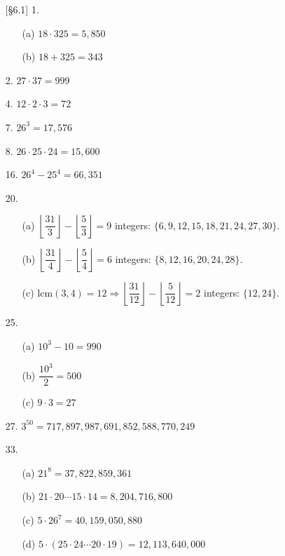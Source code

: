 \documentclass{article}
\begin{document}
\begin{enumerate}
    \item[{[\S 6.1]} 1.]
        \begin{itemize}
            \item[(a)] $18 \cdot 325 = 5,850$
            \item[(b)] $18 + 325 = 343$
        \end{itemize}
    \item[2.] $27 \cdot 37 = 999$
    \item[4.] $12 \cdot 2 \cdot 3 = 72$
    \item[7.] $26^3 = 17,576$
    \item[8.] $26 \cdot 25 \cdot 24 = 15,600$
    \item[16.] $26^4 - 25^4 = 66,351$
    \item[20.]
        \begin{itemize}
            \item[(a)] $\left\lfloor\dfrac{31}{3}\right\rfloor - \left\lfloor\dfrac{5}{3}\right\rfloor = 9$ integers: $\{ 6, 9, 12, 15, 18, 21, 24, 27, 30 \}$.
            \item[(b)] $\left\lfloor\dfrac{31}{4}\right\rfloor - \left\lfloor\dfrac{5}{4}\right\rfloor = 6$ integers: $\{ 8, 12, 16, 20, 24, 28 \}$.
            \item[(c)] $\mathrm{lcm}(3,4) = 12 \Longrightarrow \left\lfloor\dfrac{31}{12}\right\rfloor - \left\lfloor\dfrac{5}{12}\right\rfloor = 2$ integers: $\{ 12, 24 \}$.
        \end{itemize}
    \item[25.]
        \begin{itemize}
            \item[(a)] $10^3 - 10 = 990$
            \item[(b)] $\dfrac{10^3}{2} = 500$
            \item[(c)] $9 \cdot 3 = 27$
        \end{itemize}
    \item[27.] $3^{50} = 717,897,987,691,852,588,770,249$
    \item[33.]
        \begin{itemize}
            \item[(a)] $21^8 = 37,822,859,361$
            \item[(b)] $21 \cdot 20 \cdots 15 \cdot 14 = 8,204,716,800$
            \item[(c)] $5 \cdot 26^7 = 40,159,050,880$
            \item[(d)] $5 \cdot (25 \cdot 24 \cdots 20 \cdot 19) = 12,113,640,000$

\end{itemize}
\end{enumerate}
\end{document}
